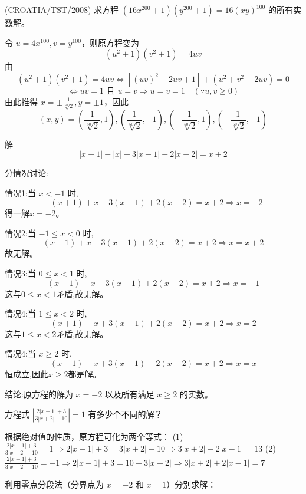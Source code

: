 \begin{questions}
\question
(CROATIA/TST/2008) 求方程 $\left(16x^{200}+1\right)\left(y^{200}+1\right)=16(xy)^{100}$ 的所有实数解。
\begin{solution}
令 $u=4x^{100}, v=y^{100}$，则原方程变为
\[
\left(u^2+1\right)\left(v^2+1\right)=4uv
\]
由
\[
\left(u^2+1\right)\left(v^2+1\right)=4uv \Leftrightarrow \left[(uv)^2-2uv+1\right]+\left(u^2+v^2-2uv\right)=0
\]
\[
\Leftrightarrow uv=1 \text{ 且 } u=v \Rightarrow u=v=1 \quad (\because u, v \ge 0)
\]
由此推得 $x=\pm\frac{1}{\sqrt[50]{2}}, y=\pm1$，因此
\[
(x, y)=\left(\frac{1}{\sqrt[50]{2}}, 1\right), \left(\frac{1}{\sqrt[50]{2}}, -1\right), \left(-\frac{1}{\sqrt[50]{2}}, 1\right), \left(-\frac{1}{\sqrt[50]{2}}, -1\right)
\]
\end{solution}

    \question 解
    \[ 
    |x + 1|-|x|+3|x-1|-2|x-2|=x+2 
    \]
    \begin{solution}
        分情况讨论:

        情况1:当 $x < -1$ 时,
        \[
        -(x+1) + x - 3(x-1) + 2(x-2) = x+2 \Rightarrow x = -2
        \]
        得一解$x = -2$。

        情况2:当 $-1 \le x < 0$ 时,
        \[
        (x+1) + x - 3(x-1) + 2(x-2) = x+2 \Rightarrow x = x+2
        \]
        故无解。
        
        情况3:当 $0 \le x < 1$ 时,
        \[
        (x+1) - x - 3(x-1) + 2(x-2) = x+2 \Rightarrow x = -1 \]
        这与$0 \le x < 1$矛盾,故无解。

        情况4:当 $1 \le x < 2$ 时,
        \[
        (x+1) - x + 3(x-1) + 2(x-2) = x+2 \Rightarrow x = 2 \]
        这与$1 \le x < 2$矛盾,故无解。

        情况4:当 $x \ge 2$ 时,
        \[ 
        (x+1) - x + 3(x-1) - 2(x-2) = x+2 \Rightarrow x = x
        \]
        恒成立,因此$x \ge 2$都是解。

        结论:原方程的解为 $x = -2$ 以及所有满足 $x \ge 2$ 的实数。
    \end{solution}

    \question 方程式 $\left| \frac{2|x-1|+3}{3|x+2|-10} \right| = 1$ 有多少个不同的解？
\begin{solution}
根据绝对值的性质，原方程可化为两个等式：
(1) $\frac{2|x-1|+3}{3|x+2|-10} = 1 \Rightarrow 2|x-1| + 3 = 3|x+2| - 10 \Rightarrow 3|x+2| - 2|x-1| = 13$
(2) $\frac{2|x-1|+3}{3|x+2|-10} = -1 \Rightarrow 2|x-1| + 3 = 10 - 3|x+2| \Rightarrow 3|x+2| + 2|x-1| = 7$

利用零点分段法（分界点为 $x = -2$ 和 $x = 1$）分别求解：


\end{solution}
\end{questions}
